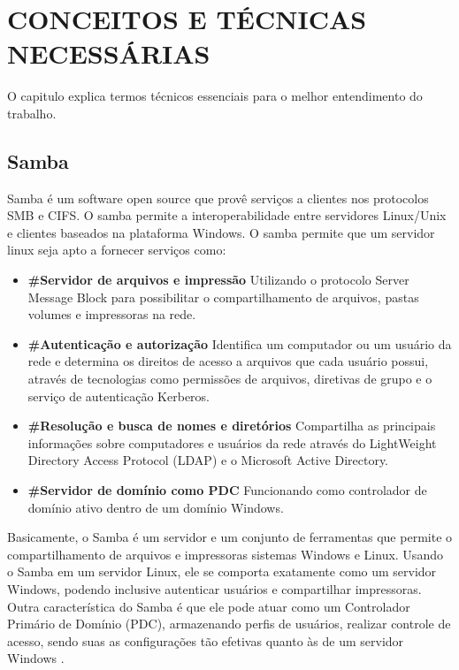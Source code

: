 \chapter{CONCEITOS E TÉCNICAS NECESSÁRIAS}

O capitulo explica termos técnicos essenciais para o melhor entendimento do trabalho.

\section{Samba}

Samba é um software open source que provê serviços a clientes nos protocolos SMB e CIFS.
O samba permite a interoperabilidade entre servidores Linux/Unix e clientes baseados na
plataforma Windows.
O samba permite que um servidor linux seja apto a fornecer serviços como:
  \begin{itemize}
    \item \textbf{\#Servidor de arquivos e impressão} Utilizando o protocolo Server Message Block para possibilitar o compartilhamento de arquivos, pastas volumes e impressoras na rede.

    \item \textbf{\#Autenticação e autorização} Identifica um computador ou um usuário da rede e determina os direitos de acesso a arquivos que cada usuário possui, através de tecnologias como permissões de arquivos, diretivas de grupo e o serviço de autenticação Kerberos.

    \item \textbf{\#Resolução e busca de nomes e diretórios} Compartilha as principais informações sobre computadores e usuários da rede através do LightWeight Directory Access Protocol (LDAP) e o Microsoft Active Directory.

    \item \textbf{\#Servidor de domínio como PDC} Funcionando como controlador de domínio ativo dentro de um domínio Windows.
  \end{itemize}

Basicamente, o Samba é um servidor e um conjunto de ferramentas que permite o compartilhamento de arquivos e impressoras sistemas Windows e Linux. Usando o Samba em um servidor Linux, ele se comporta exatamente como um servidor Windows, podendo inclusive autenticar usuários e compartilhar impressoras. Outra característica do Samba é que ele pode atuar como um Controlador Primário de Domínio (PDC), armazenando perfis de usuários, realizar controle de acesso, sendo suas as configurações tão efetivas quanto às de um servidor Windows \cite{FOCA}.

